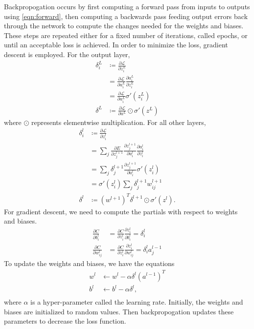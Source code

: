 \documentclass{IEEEtran}
\begin{document}
Backpropogation occurs by first computing a forward pass from inputs to outputs
using \ref{eqn:forward}, then computing a backwards pass feeding output errors
back through the network to compute the changes needed for the weights and
biases. These steps are repeated either for a fixed number of iterations, called
epochs, or until an acceptable loss is achieved. In order to minimize the loss,
gradient descent is employed. For the output layer,
\begin{align*}
    \delta_{i}^{L} & \coloneqq\frac{\partial\mathcal{L}}{\partial z_{i}^{L}} \\
     & = \frac{\partial\mathcal{L}}{\partial a_{i}^{L}}\frac{\partial a_{i}^{L}}{\partial z_{i}^{L}} \\
     & = \frac{\partial\mathcal{L}}{\partial a_{i}^{L}}\sigma'\left(z_{i}^{L}\right)\\
    \delta^{L} & \coloneqq\frac{\partial\mathcal{L}}{\partial a^{L}}\odot\sigma'\left(z^{L}\right)
\end{align*}
where \(\odot\) represents elementwise multiplication. For all other layers,
\begin{align*}
    \delta_{i}^{l} & \coloneqq\frac{\partial\mathcal{L}}{\partial z_{i}^{l}} \\
     & = \sum_{j} \frac{\partial E}{\partial z_{j}^{l + 1}} \frac{\partial z_{j}^{l + 1}}{\partial a_{i}^{l}}\frac{\partial a_{i}^{l}}{\partial z_{i}^{l}} \\
     & = \sum_{j} \delta_{j}^{l + 1} \frac{\partial z_{j}^{l + 1}}{\partial a_{i}^{l}} \sigma'\left(z_{i}^{l}\right) \\
     & = \sigma'\left(z_{i}^{l}\right) \sum_{j} \delta_{j}^{l + 1} w_{i j}^{l + 1} \\
    \delta^{l} & \coloneqq\left(w^{l + 1}\right)^{T} \delta^{l + 1}\odot\sigma'\left(z^{l}\right)\text{.}
\end{align*}
For gradient descent, we need to compute the partials with respect to weights
and biases.
\begin{align*}
    \frac{\partial C}{\partial b_{i}^{l}} & = \frac{\partial C}{\partial z_{i}^{l}}\frac{\partial z_{i}^{l}}{\partial b_{i}^{l}} = \delta_{i}^{l} \\
    \frac{\partial C}{\partial w_{ij}^{l}} & = \frac{\partial C}{\partial z_{i}^{l}}\frac{\partial z_{i}^{l}}{\partial w_{ij}^{l}} = \delta_{i}^{l} a_{j}^{l - 1}
\end{align*}
To update the weights and biases, we have the equations
\begin{align*}
    w^{l} & \leftarrow w^{l} - \alpha \delta^{l} {\left(a^{l - 1}\right)}^{T} \\
    b^{l} & \leftarrow b^{l} - \alpha \delta^{l}\text{,} \\ 
\end{align*}
where \(\alpha\) is a hyper-parameter called the learning rate. Initially, the
weights and biases are initialized to random values. Then backpropogation
updates these parameters to decrease the loss function.
\end{document}
